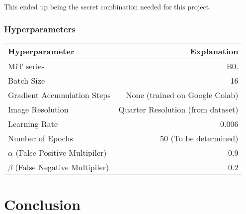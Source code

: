 \documentclass[12pt]{article}
\begin{document}
    This ended up being the secret combination needed for this project.

    \subsubsection*{Hyperparameters}

    \begin{center}
        \begin{tabular}{ | l | r | }
            \hline
            \textbf{Hyperparameter} & \textbf{Explanation} \\
            \hline
            MiT series & B0. \\
            \hline
            Batch Size & 16 \\
            \hline
            Gradient Accumulation Steps & None (trained on Google Colab) \\
            \hline
            Image Resolution & Quarter Resolution (from dataset) \\
            \hline
            Learning Rate & 0.006 \\
            \hline
            Number of Epochs & 50 (To be determined) \\
            \hline
            $\alpha$ (False Positive Multipiler) & 0.9 \\
            \hline
            $\beta$ (False Negative Multipiler) & 0.2 \\
            \hline
        \end{tabular}
    \end{center}

    \section{Conclusion}

    \newpage
    
\end{document}
